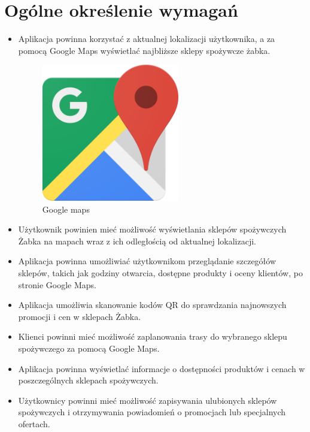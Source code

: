 \newpage
\section{Ogólne określenie wymagań}		%
\begin{itemize}
	\item Aplikacja powinna korzystać z aktualnej lokalizacji użytkownika, a za pomocą Google Maps wyświetlać najbliższe sklepy spożywcze żabka.
	\begin{figure}[!hbt]
		\begin{center}
			\includegraphics[width=6cm]{rys/Google-maps.png}
			\caption{Google maps}
			\label{rys:gps-icon}
		\end{center}
	\end{figure}
	\item Użytkownik powinien mieć możliwość wyświetlania sklepów spożywczych Żabka na mapach wraz z ich odległością od aktualnej lokalizacji.
	\item Aplikacja powinna umożliwiać użytkownikom przeglądanie szczegółów sklepów, takich jak godziny otwarcia, dostępne produkty i oceny klientów, po stronie Google Maps.
	\item Aplikacja umożliwia skanowanie kodów QR do sprawdzania najnowszych promocji i cen w sklepach Żabka.
	\item Klienci powinni mieć możliwość zaplanowania trasy do wybranego sklepu spożywczego za pomocą Google Maps.
	\item Aplikacja powinna wyświetlać informacje o dostępności produktów i cenach w poszczególnych sklepach spożywczych.
	\item Użytkownicy powinni mieć możliwość zapisywania ulubionych sklepów spożywczych i otrzymywania powiadomień o promocjach lub specjalnych ofertach.	
\end{itemize}
